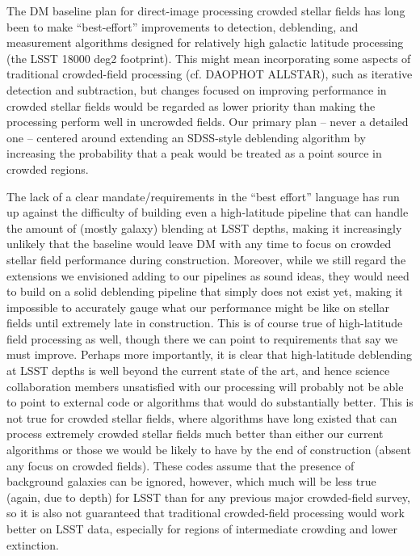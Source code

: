 \documentclass[DM,authoryear,toc]{lsstdoc}
\begin{document}
The DM baseline plan for direct-image processing crowded stellar fields has long been to make ``best-effort'' improvements to detection, deblending, and measurement algorithms designed for relatively high galactic latitude processing (the LSST 18000 deg2 footprint).
This might mean incorporating some aspects of traditional crowded-field processing (cf. DAOPHOT ALLSTAR), such as iterative detection and subtraction, but changes focused on improving performance in crowded stellar fields would be regarded as lower priority than making the processing perform well in uncrowded fields.
Our primary plan -- never a detailed one -- centered around extending an SDSS-style deblending algorithm by increasing the probability that a peak would be treated as a point source in crowded regions.

The lack of a clear mandate/requirements in the ``best effort'' language has run up against the difficulty of building even a high-latitude pipeline that can handle the amount of (mostly galaxy) blending at LSST depths, making it increasingly unlikely that the baseline would leave DM with any time to focus on crowded stellar field performance during construction.
Moreover, while we still regard the extensions we envisioned adding to our pipelines as sound ideas, they would need to build on a solid deblending pipeline that simply does not exist yet, making it impossible to accurately gauge what our performance might be like on stellar fields until extremely late in construction.
This is of course true of high-latitude field processing as well, though there we can point to requirements that say we must improve.
Perhaps more importantly, it is clear that high-latitude deblending at LSST depths is well beyond the current state of the art, and hence science collaboration members unsatisfied with our processing will probably not be able to point to external code or algorithms that would do substantially better.
This is not true for crowded stellar fields, where algorithms have long existed that can process extremely crowded stellar fields much better than either our current algorithms or those we would be likely to have by the end of construction (absent any focus on crowded fields).
These codes assume that the presence of background galaxies can be ignored, however, which much will be less true (again, due to depth) for LSST than for any previous major crowded-field survey, so it is also not guaranteed that traditional crowded-field processing would work better on LSST data, especially for regions of intermediate crowding and lower extinction.
\end{document}
